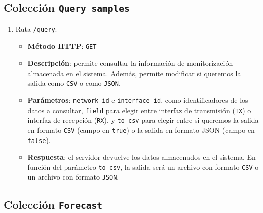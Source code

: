 \documentclass[a4paper, oneside, 12pt]{book}
\begin{document}
	\subsection{Colección \texttt{Query samples}}
	
	\begin{enumerate}
		\item Ruta \texttt{/query}:
		
		\begin{itemize}
			\item \textbf{Método HTTP}: \texttt{GET}
			\item \textbf{Descripción}: permite consultar la información de monitorización almacenada en el sistema. Además, permite modificar si queremos la salida como \texttt{CSV} o como \texttt{JSON}.
			\item \textbf{Parámetros}: \texttt{network\_id} e \texttt{interface\_id}, como identificadores de los datos a consultar, \texttt{field} para elegir entre interfaz de transmisión (\texttt{TX}) o interfaz de recepción (\texttt{RX}), y \texttt{to\_csv} para elegir entre si queremos la salida en formato \texttt{CSV} (campo en \texttt{true}) o la salida en formato JSON (campo en \texttt{false}).
			\item \textbf{Respuesta}: el servidor devuelve los datos almacenados en el sistema. En función del parámetro \texttt{to\_csv}, la salida será un archivo con formato \texttt{CSV} o un archivo con formato \texttt{JSON}.
		\end{itemize}
	\end{enumerate}
	
	\pagebreak
	
	\subsection{Colección \texttt{Forecast}}
	
\end{document}
